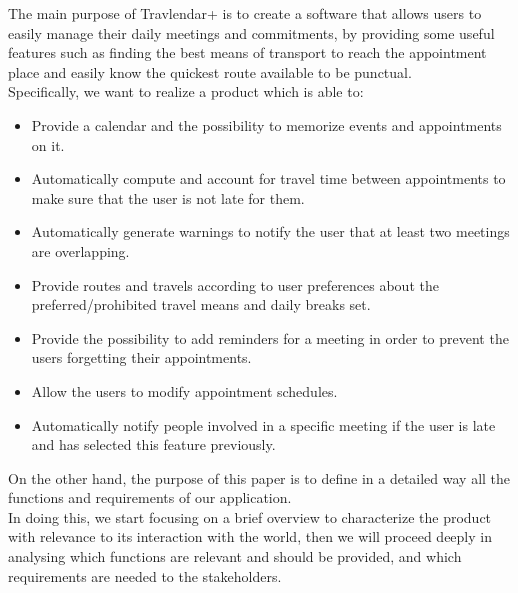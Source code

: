 The main purpose of Travlendar+ is to create a software that allows users to easily manage their daily meetings and commitments, by providing some useful features such as finding the best means of transport to reach the appointment place and easily know the quickest route available to be punctual.\\
Specifically, we want to realize a product which is able to:
\begin{itemize}

\item Provide a calendar and the possibility to memorize events and appointments on it.

\item Automatically compute and account for travel time between appointments to make sure that the user is not late for them.

\item Automatically generate warnings to notify the user that at least two meetings are overlapping.

\item Provide routes and travels according to user preferences about the preferred/prohibited travel means and daily breaks set.

\item Provide the possibility to add reminders for a meeting in order to prevent the users forgetting their appointments.

\item Allow the users to modify appointment schedules.

\item Automatically notify people involved in a specific meeting if the user is late and has selected this feature previously. 


\end{itemize}

On the other hand, the purpose of this paper is to define in a detailed way all the functions and requirements of our application.\\ In doing this, we start focusing on a brief overview to characterize the product with relevance to its interaction with the world, then we will proceed deeply in analysing which functions are relevant and should be provided, and which requirements are needed to the stakeholders. 
